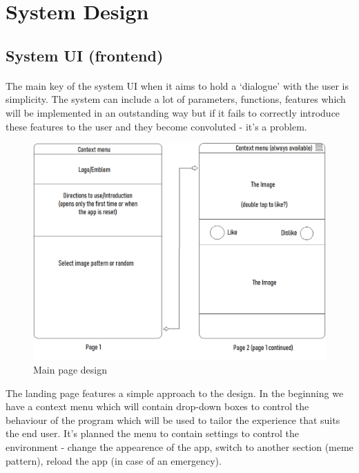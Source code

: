 \documentclass[12pt]{report}
\begin{document}
    
    \section*{System Design}

    \subsection*{System UI (frontend)}
    \paragraph{}

    The main key of the system UI when it aims to hold a `dialogue' with the user is simplicity. The system can include a lot of parameters, functions, features which will be implemented in an outstanding way but if it fails to correctly introduce these features to the user and they become convoluted - it's a problem.
    
    \clearpage

    \begin{figure}[htbp]
        \centerline{\includegraphics[scale=.5]{img/system_ui.png}}
        \label{system_ui}
        \caption{Main page design}
    \end{figure}

    The landing page features a simple approach to the design. In the beginning we have a context menu which will contain drop-down boxes to control the behaviour of the program which will be used to tailor the experience that suits the end user. It's planned the menu to contain settings to control the environment - change
    the appearence of the app, switch to another section (meme pattern), reload the app (in case of an emergency). 
\end{document}
